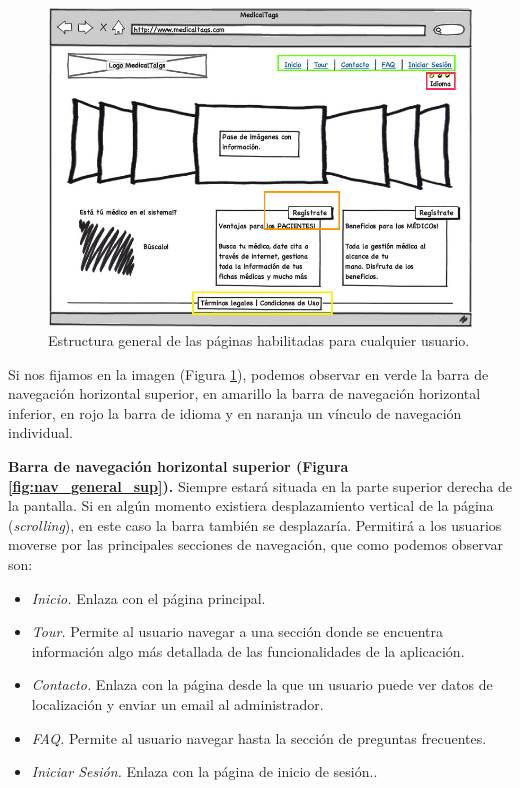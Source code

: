 \documentclass[a4paper,oneside,11pt]{book}
\begin{document}
		\begin{figure}[H]
		  \centering
		    \includegraphics[width=15cm]{img/jpg/nav/general.jpg}
		  \caption{Estructura general de las páginas habilitadas para cualquier usuario.}
		  \label{fig:nav_general}
		\end{figure}
		
		Si nos fijamos en la imagen (Figura \ref{fig:nav_general}), podemos observar en verde la barra de navegación horizontal superior, en amarillo la barra de navegación horizontal inferior, en rojo la barra de idioma y en naranja un vínculo de navegación individual.
		
		\textbf{Barra de navegación horizontal superior (Figura \ref{fig:nav_general_sup}).} Siempre estará situada en la parte superior derecha de la pantalla. Si en algún momento existiera desplazamiento vertical de la página (\textit{scrolling}), en este caso la barra también se desplazaría. Permitirá a los usuarios moverse por las principales secciones de navegación, que como podemos observar son:
		\begin{itemize}
			\item \textit{Inicio.} Enlaza con el página principal.
			\item \textit{Tour.} Permite al usuario navegar a una sección donde se encuentra información algo más detallada de las funcionalidades de la aplicación.
			\item \textit{Contacto.} Enlaza con la página desde la que un usuario puede ver datos de localización y enviar un email al administrador.
			\item \textit{FAQ.} Permite al usuario navegar hasta la sección de preguntas frecuentes.
			\item \textit{Iniciar Sesión.} Enlaza con la página de inicio de sesión..
		\end{itemize}
		
\end{document}
